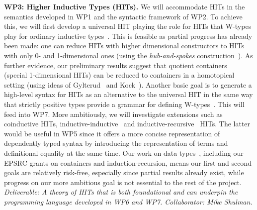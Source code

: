 \documentclass[a4paper,11pt]{article}
\begin{document}


{\bf WP3: Higher Inductive Types (HITs).}  We will accommodate HITs in
the semantics developed in WP1 and the syntactic framework of WP2. To
achieve this, we will first develop a universal HIT playing the role
for HITs that W-types play for ordinary inductive
types~\cite{alti:cont-tcs}. This is feasible as partial progress has
already been made: one can reduce HITs with higher dimensional
constructors to HITs with only 0- and 1-dimensional ones (using the
\emph{hub-and-spokes} construction~\cite{hott-book}). As further evidence, our
preliminary results suggest that quotient
containers~\cite{alti:mpc04} (special 1-dimensional HITs)
can be reduced to containers in
a homotopical setting (using ideas of Gylterud~\cite{gylterud:thesis}
and Kock~\cite{kock:groupoids}).  Another basic goal is to generate a
high-level syntax for HITs as an alternative to the universal HIT in
the same way that strictly positive types provide a grammar for
defining W-types~\cite{alti:cont-tcs}.  This will feed into WP7.  More
ambitiously, we will %
investigate extensions such as coinductive HITs, 
inductive-inductive~\cite{alti:catind2} and
inductive-recursive~\cite{DS:indrec,ghani:fibredIR} HITs. The latter
would be useful in WP5 since it offers a more concise representation
of dependently typed syntax by introducing the representation of terms and 
 definitional equality at the same time.
Our work on data
types~\cite{alti:cont-tcs,
altenkirchGhaniHancockMcBrideMorris:indexedContainers,
alti:catind2,ghani:fibredIR,GambinoN:polfpm,awodeyGamSoja:indTypesInHTT},
including our EPSRC grants on containers and induction-recursion, means
our first and second goals
are relatively risk-free,
especially since partial results already exist, 
while progress on our more ambitious goal 
is not essential to the rest of the project. {\em Deliverable: A
  theory of HITs that is both foundational and can underpin the
  programming language developed in WP6 and WP7. 
Collaborator: Mike Shulman. 
}
\end{document}
